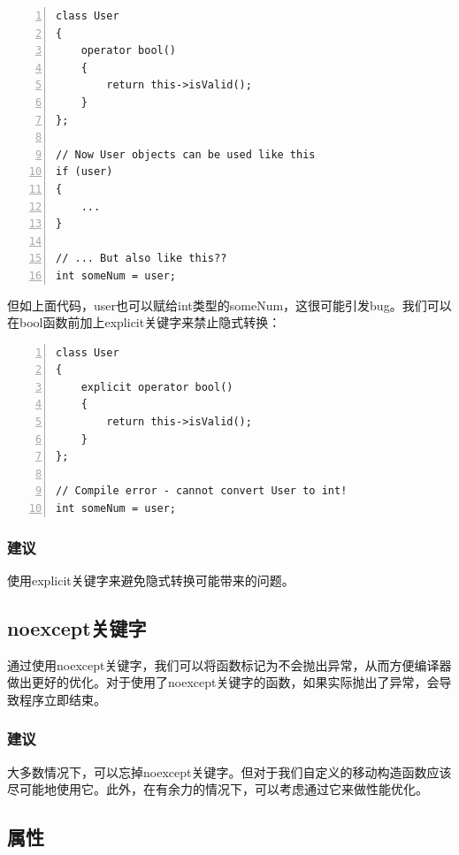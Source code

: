 \documentclass{ctexart}
\begin{document}
\begin{lstlisting}[language={[ANSI]C},keywordstyle=\color{blue!70},commentstyle=\color{red!50!green!50!blue!50},frame=shadowbox, rulesepcolor=\color{red!20!green!20!blue!20},basicstyle=\small,numbers=left, numberstyle=\tiny,breaklines=true]
class User
{
	operator bool()
	{
		return this->isValid();
	}
};

// Now User objects can be used like this
if (user)
{
	...
}

// ... But also like this??
int someNum = user;
\end{lstlisting}

但如上面代码，user也可以赋给int类型的someNum，这很可能引发bug。我们可以在bool函数前加上explicit关键字来禁止隐式转换：

\begin{lstlisting}[language={[ANSI]C},keywordstyle=\color{blue!70},commentstyle=\color{red!50!green!50!blue!50},frame=shadowbox, rulesepcolor=\color{red!20!green!20!blue!20},basicstyle=\small,numbers=left, numberstyle=\tiny,breaklines=true]
class User
{
	explicit operator bool()
	{
		return this->isValid();
	}
};

// Compile error - cannot convert User to int!
int someNum = user;
\end{lstlisting}

\subsubsection*{建议}

使用explicit关键字来避免隐式转换可能带来的问题。

\subsection{noexcept关键字}

通过使用noexcept关键字，我们可以将函数标记为不会抛出异常，从而方便编译器做出更好的优化。对于使用了noexcept关键字的函数，如果实际抛出了异常，会导致程序立即结束。

\subsubsection*{建议}

大多数情况下，可以忘掉noexcept关键字。但对于我们自定义的移动构造函数应该尽可能地使用它。此外，在有余力的情况下，可以考虑通过它来做性能优化。

\subsection{属性}
\end{document}
